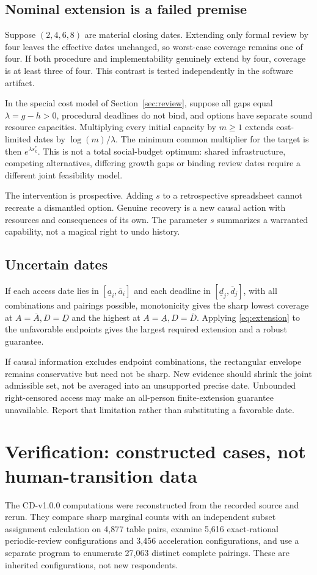 \documentclass[11pt,a4paper]{article}
\theoremstyle{definition}\newtheorem{definition}{Definition}
\begin{document}
\subsection{Nominal extension is a failed premise}
Suppose $(2,4,6,8)$ are material closing dates. Extending only formal review by four leaves the effective dates unchanged, so worst-case coverage remains one of four. If both procedure and implementability genuinely extend by four, coverage is at least three of four. This contrast is tested independently in the software artifact.

In the special cost model of Section~\ref{sec:review}, suppose all gaps equal $\lambda=g-h>0$, procedural deadlines do not bind, and options have separate sound resource capacities. Multiplying every initial capacity by $m\ge1$ extends cost-limited dates by $\log(m)/\lambda$. The minimum common multiplier for the target is then $e^{\lambda s_k^*}$. This is not a total social-budget optimum: shared infrastructure, competing alternatives, differing growth gaps or binding review dates require a different joint feasibility model.

The intervention is prospective. Adding $s$ to a retrospective spreadsheet cannot recreate a dismantled option. Genuine recovery is a new causal action with resources and consequences of its own. The parameter $s$ summarizes a warranted capability, not a magical right to undo history.

\subsection{Uncertain dates}
If each access date lies in $[\underline a_i,\overline a_i]$ and each deadline in $[\underline d_j,\overline d_j]$, with all combinations and pairings possible, monotonicity gives the sharp lowest coverage at $A=\overline A,D=\underline D$ and the highest at $A=\underline A,D=\overline D$. Applying \cref{eq:extension} to the unfavorable endpoints gives the largest required extension and a robust guarantee.

If causal information excludes endpoint combinations, the rectangular envelope remains conservative but need not be sharp. New evidence should shrink the joint admissible set, not be averaged into an unsupported precise date. Unbounded right-censored access may make an all-person finite-extension guarantee unavailable. Report that limitation rather than substituting a favorable date.

\section{Verification: constructed cases, not human-transition data}
\label{sec:tests}
The CD-v1.0.0 computations were reconstructed from the recorded source and rerun. They compare sharp marginal counts with an independent subset assignment calculation on 4,877 table pairs, examine 5,616 exact-rational periodic-review configurations and 3,456 acceleration configurations, and use a separate program to enumerate 27,063 distinct complete pairings. These are inherited configurations, not new respondents.
\end{document}
